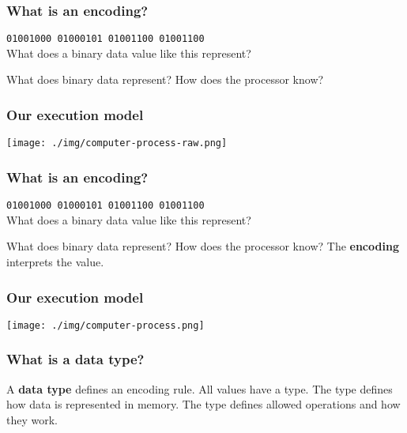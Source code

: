 \documentclass[11pt]{beamer}
\begin{document}
\begin{frame}
  \frametitle{What is an \textbf{encoding}?}
  \Enlarge

  \texttt{01001000 01000101 01001100 01001100} \\
  What does a binary data value like this represent?
  \begin{itemize}
  \myitem  What does binary data represent? \pause
  \myitem  How does the processor know?
  \end{itemize}
\end{frame}

\begin{frame}
  \frametitle{Our execution model}
  \texttt{[image: ./img/computer-process-raw.png]}
\end{frame}

\begin{frame}
  \frametitle{What is an \textbf{encoding}?}
  \Enlarge

  \texttt{01001000 01000101 01001100 01001100} \\
  What does a binary data value like this represent?
  \begin{itemize}
  \myitem  What does binary data represent?
  \myitem  How does the processor know?
  \myitem  The \textbf{encoding} interprets the value.
  \end{itemize}
\end{frame}

\begin{frame}
  \frametitle{Our execution model}
  \texttt{[image: ./img/computer-process.png]}
\end{frame}

\begin{frame}
  \frametitle{What is a \textbf{data type}?}
  \Enlarge

  \begin{itemize}
  \myitem  A \textbf{data type} defines an encoding rule.
  \myitem  All values have a type. \pause
  \myitem  The type defines how data is represented in memory. \pause
  \myitem  The type defines allowed operations and how they work.
  \end{itemize}
\end{frame}
\end{document}

